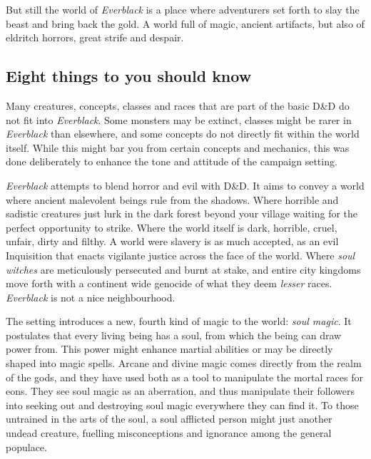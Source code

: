 But still the world of \emph{Everblack} is a place where adventurers set forth
to slay the beast and bring back the gold. A world full of magic, ancient
artifacts, but also of eldritch horrors, great strife and despair.

\subsection{Eight things to you should know}

\begin{enumerate}
  Many creatures, concepts, classes and
 races that are part of the basic D\&D do not fit into \emph{Everblack}. Some
 monsters may be extinct, classes might be rarer in \emph{Everblack} than
 elsewhere, and some concepts do not directly fit within the world
 itself. While this might bar you from certain concepts and mechanics, this
 was done deliberately to enhance the tone and attitude of the campaign
 setting.

  \emph{Everblack} attempts to blend horror and evil with
 D\&D. It aims to convey a world where ancient malevolent beings rule from the
 shadows. Where horrible and sadistic creatures just lurk in the dark forest
 beyond your village waiting for the perfect opportunity to strike. Where the
 world itself is dark, horrible, cruel, unfair, dirty and filthy. A world were
 slavery is as much accepted, as an evil Inquisition that enacts vigilante
 justice across the face of the world. Where \emph{soul witches} are
 meticulously persecuted and burnt at stake, and entire city kingdoms move
 forth with a continent wide genocide of what they deem \emph{lesser} races.
 \emph{Everblack} is not a nice neighbourhood.

  The setting introduces a new, fourth kind of magic to the
 world: \emph{soul magic}. It postulates that every living being has a soul,
 from which the being can draw power from. This power might enhance martial
 abilities or may be directly shaped into magic spells. Arcane and divine
 magic comes directly from the realm of the gods, and they have used both as a
 tool to manipulate the mortal races for eons. They see soul magic as an
 aberration, and thus manipulate their followers into seeking out and
 destroying soul magic everywhere they can find it. To those untrained in the
 arts of the soul, a soul afflicted person might just another undead creature,
 fuelling misconceptions and ignorance among the general populace.


\end{enumerate}
